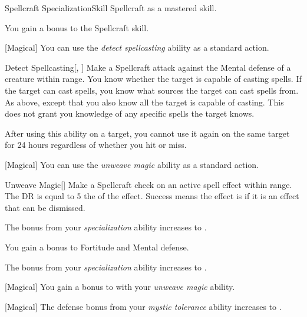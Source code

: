     \begin{feat}{Spellcraft Specialization}{Skill}
        \featpre Spellcraft as a mastered skill.

         You gain a  bonus to the Spellcraft skill.

        [Magical] You can use the \textit{detect spellcasting} ability as a standard action.
        \begin{apability}{Detect Spellcasting}[, ]
            Make a Spellcraft attack against the Mental defense of a creature within \rngmed range.
            \hit You know whether the target is capable of casting spells.
            If the target can cast spells, you know what sources the target can cast spells from.
            \crit As above, except that you also know all  the target is capable of casting.
            This does not grant you knowledge of any specific spells the target knows.

            After using this ability on a target, you cannot use it again on the same target for 24 hours regardless of whether you hit or miss.
        \end{apability}

        [Magical] You can use the \textit{unweave magic} ability as a standard action.
        \begin{apability}{Unweave Magic}[]
            Make a Spellcraft check on an active spell effect within \rngmed range.
            The DR is equal to 5 \add the  of the effect.
            Success means the effect is  if it is an effect that can be dismissed.
        \end{apability}

         The bonus from your \textit{specialization} ability increases to .

         You gain a  bonus to Fortitude and Mental defense.

         The bonus from your \textit{specialization} ability increases to .

        [Magical] You gain a  bonus to  with your \textit{unweave magic} ability.

        [Magical] The defense bonus from your \textit{mystic tolerance} ability increases to .
    \end{feat}

